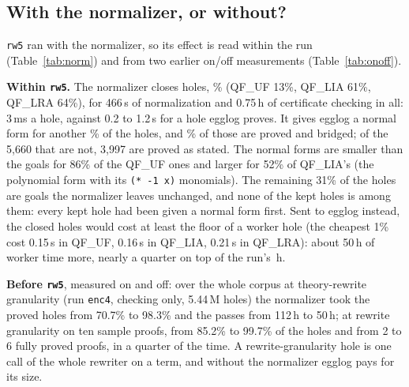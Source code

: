 \documentclass[11pt,a4paper]{article}
\newcommand{\UF}{QF\_UF}
\newcommand{\LIA}{QF\_LIA}
\newcommand{\LRA}{QF\_LRA}
\newcommand{\code}[1]{\texttt{#1}}
\begin{document}
\subsection{With the normalizer, or without?}\label{sec:q-norm}

\code{rw5} ran with the normalizer, so its effect is read within the run
(Table~\ref{tab:norm}) and from two earlier on/off measurements
(Table~\ref{tab:onoff}).

\textbf{Within \code{rw5}.} The normalizer closes \nclosed{} holes,
\closedshare\% (\UF{} 13\%, \LIA{} 61\%, \LRA{} 64\%), for 466\,s of
normalization and 0.75\,h of certificate checking in all: 3\,ms a hole,
against 0.2 to 1.2\,s for a hole egglog proves. It gives egglog a normal
form for another \triedshare\% of the holes, and \bridgedshare\% of those are
proved and bridged; of the 5,660 that are not, 3,997 are proved as stated.
The normal forms are smaller than the goals for 86\% of the \UF{} ones and
larger for 52\% of \LIA{}'s (the polynomial form with its \code{(* -1 x)}
monomials). The remaining 31\% of the holes are goals the normalizer leaves
unchanged, and none of the \nkept{} kept holes is among them: every kept hole
had been given a normal form first. Sent to egglog instead, the closed holes
would cost at least the floor of a worker hole (the cheapest 1\% cost
0.15\,s in \UF{}, 0.16\,s in \LIA{}, 0.21\,s in \LRA{}): about 50\,h of worker
time more, nearly a quarter on top of the run's \workerhours\,h.

\begin{table}[htbp]
  \centering\small
  \resizebox{\textwidth}{!}{}
  \caption{The normalizer in the elaboration pass. ``Normal form tried
    first'': egglog on the equality of the normal forms, on a third of the
    hole's budget; ``bridged'': its certificate connected to the stated sides
    by the normalizer's derivations. Normalization time includes building
    the closing certificates.}
  \label{tab:norm}
\end{table}

\textbf{Before \code{rw5}}, measured on and off: over the whole corpus at
theory-rewrite granularity (run \code{enc4}, checking only, 5.44\,M holes)
the normalizer took the proved holes from 70.7\% to 98.3\% and the passes
from 112\,h to 50\,h; at rewrite granularity on ten sample proofs, from
85.2\% to 99.7\% of the holes and from 2 to 6 fully proved proofs, in a
quarter of the time. A rewrite-granularity hole is one call of the whole
rewriter on a term, and without the normalizer egglog pays for its size.
\end{document}
